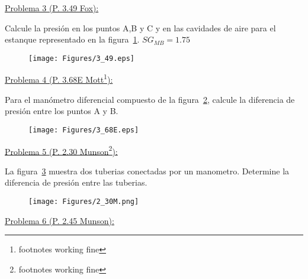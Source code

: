 \documentclass[11pt]{report}
\begin{document}
\vspace{0.5cm}
\underline {Problema 3 (P. 3.49 Fox):}
\vspace{0.2cm}

Calcule la presi\'on en los puntos A,B y C y en las cavidades de aire para el estanque representado en la figura~\ref{fig:fig3}. $SG_{MB}=1.75$

\begin{figure}[H]
\centering\texttt{[image: Figures/3\_49.eps]}
\caption{\label{fig:fig3} }
\end{figure}

\newpage

\vspace{0.5cm}
\underline {Problema 4 (P. 3.68E Mott\footnote{footnotes working fine}):}
\vspace{0.2cm}

Para el man\'ometro diferencial compuesto de la figura~\ref{fig:fig4}, calcule la diferencia de presi\'on entre los puntos A y B.

\begin{figure}[H]
\centering\texttt{[image: Figures/3\_68E.eps]}
\caption{\label{fig:fig4} }
\end{figure}


\newpage


\vspace{0.5cm}
\underline {Problema 5 (P. 2.30 Munson\footnote{footnotes working fine}):}
\vspace{0.2cm}

La figura~\ref{fig:fig5} muestra dos tuberias conectadas por un manometro. Determine la diferencia de presi\'on entre las tuberias.

\begin{figure}[H]
\centering\texttt{[image: Figures/2\_30M.png]}
\caption{\label{fig:fig5} }
\end{figure}



\vspace{0.5cm}
\underline {Problema 6 (P. 2.45 Munson):}
\vspace{0.2cm}
\end{document}
